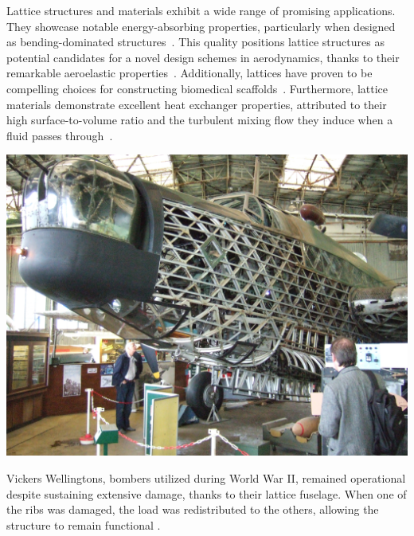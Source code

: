 Lattice structures and materials exhibit a wide range of promising applications. They showcase notable energy-absorbing properties, particularly when designed as bending-dominated structures~. This quality positions lattice structures as potential candidates for a novel design schemes in aerodynamics, thanks to their remarkable aeroelastic properties~. Additionally, lattices have proven to be compelling choices for constructing biomedical scaffolds~. Furthermore, lattice materials demonstrate excellent heat exchanger properties, attributed to their high surface-to-volume ratio and the turbulent mixing flow they induce when a fluid passes through~.
\begin{marginfigure}
        \includegraphics[width=\linewidth]{figures/02_literature/wellington.jpg}
        \caption{Vickers Wellingtons, bombers utilized during World War II, remained operational despite sustaining extensive damage, thanks to their lattice fuselage. When one of the ribs was damaged, the load was redistributed to the others, allowing the structure to remain functional \cite{airshowconsultants_real_2013}.}
        \label{fig:vick}
\end{marginfigure}
